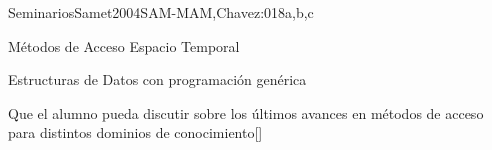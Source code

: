 \begin{syllabus}
\begin{unit}{Seminarios}{}{Samet2004SAM-MAM,Chavez:01}{8}{a,b,c}
	\begin{topics}
         \item Métodos de Acceso Espacio Temporal
         \item Estructuras de Datos con programación genérica
   \end{topics}
   \begin{learningoutcomes}
         \item Que el alumno pueda discutir sobre los últimos avances en métodos de acceso para distintos dominios de conocimiento[\Usage]
   \end{learningoutcomes}
\end{unit}

\begin{coursebibliography}
\end{coursebibliography}

\end{syllabus}
